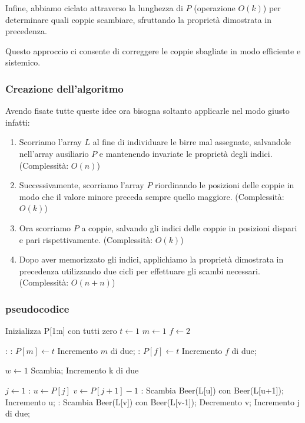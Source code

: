\documentclass{article}
\begin{document}
Infine, abbiamo ciclato attraverso la lunghezza di \(P\) (operazione \(O(k)\)) per determinare quali coppie scambiare, sfruttando la proprietà dimostrata in precedenza.

Questo approccio ci consente di correggere le coppie sbagliate in modo efficiente e sistemico.

\subsubsection{Creazione dell'algoritmo}
Avendo fisate tutte queste idee ora bisogna soltanto applicarle nel modo giusto infatti:
\begin{enumerate}
	\item Scorriamo l'array $L$ al fine di individuare le birre mal assegnate, salvandole nell'array ausiliario $P$ e mantenendo invariate le proprietà degli indici. (Complessità: $O(n)$)
	
	\item Successivamente, scorriamo l'array $P$ riordinando le posizioni delle coppie in modo che il valore minore preceda sempre quello maggiore. (Complessità: $O(k)$)
	
	\item Ora scorriamo $P$ a coppie, salvando gli indici delle coppie in posizioni dispari e pari rispettivamente. (Complessità: $O(k)$)
	
	\item Dopo aver memorizzato gli indici, applichiamo la proprietà dimostrata in precedenza utilizzando due cicli per effettuare gli scambi necessari. (Complessità: $O(n+n)$)
\end{enumerate}

\subsubsection{pseudocodice}
\begin{algorithmic}
		Inizializza P[1:n] con tutti zero
		\State $t \gets 1$ 
		\State $m \gets 1$ 
		\State $f \gets 2$ 
		
		: 
			:
				\State $ P[m] \gets t$
				\State Incremento $m$ di due; 
			:
				\State $P[f]\gets t$
				\State Incremento $f$ di due; 
			\EndIf
		\EndFor
		
		\State $w \gets 1$
		 
				\State Scambia;
			\EndIf
			\State Incremento k di due 
		\EndWhile
		
		\State $j \gets 1$
		: 
			\State $u \gets P[j]$
			\State $v \gets P[j+1] - 1$ 
			: 
				\State Scambia Beer(L[u]) con Beer(L[u+1]);
				\State Incremento u;
			\EndWhile
			: 
				\State Scambia Beer(L[v]) con Beer(L[v-1]);
				\State Decremento v;
			\EndWhile
			\State Incremento j di due;
		\EndWhile  
	\EndFunction
\end{algorithmic}
\end{document}
